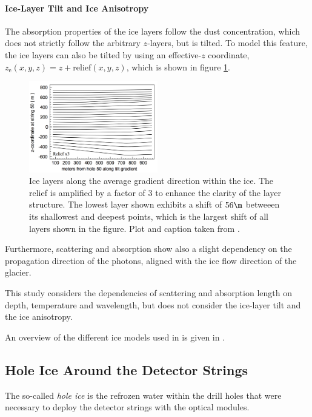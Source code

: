 \paragraph{Ice-Layer Tilt and Ice Anisotropy}
The absorption properties of the ice layers follow the dust concentration, which does not strictly follow the arbitrary $z$-layers, but is tilted. To model this feature, the ice layers can also be tilted by using an effective-$z$ coordinate, $z_\text{e}(x,y,z) = z + \text{relief}(x,y,z)$, which is shown in figure \ref{fig:wohr8uaY}. \cite{icepaper}

\begin{figure}[htbp]
  \centering
  \includegraphics[width=0.5\textwidth]{img/icepaper-fig-14-layers}
  \caption{Ice layers along the average gradient direction within the ice. The relief is amplified by a factor of 3 to enhance the clarity of the layer structure. The lowest layer shown exhibits a shift of $56\m$ betweeen its shallowest and deepest points, which is the largest shift of all layers shown in the figure. Plot and caption taken from \cite[figure 14]{icepaper}.}
  \label{fig:wohr8uaY}
\end{figure}

Furthermore, scattering and absorption show also a slight dependency on the propagation direction of the photons, aligned with the ice flow direction of the glacier. \cite{icrc17pocam}

This study considers the dependencies of scattering and absorption length on depth, temperature and wavelength, but does not consider the ice-layer tilt and the ice anisotropy.

An overview of the different ice models used in \icecube is given in \cite{flasherdataderivedicemodels}.


\subsection{Hole Ice Around the Detector Strings}
\label{sec:hole_ice}

The so-called \textit{hole ice} is the refrozen water within the drill holes that were necessary to deploy the detector strings with the optical modules.

